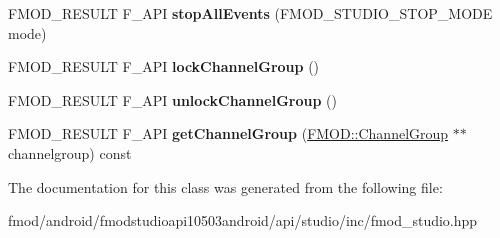 \begin{DoxyCompactItemize}
\item 
\hypertarget{class_f_m_o_d_1_1_studio_1_1_bus_ad59d014793f9eba2a59474b5122981d0}{F\+M\+O\+D\+\_\+\+R\+E\+S\+U\+L\+T F\+\_\+\+A\+P\+I {\bfseries stop\+All\+Events} (F\+M\+O\+D\+\_\+\+S\+T\+U\+D\+I\+O\+\_\+\+S\+T\+O\+P\+\_\+\+M\+O\+D\+E mode)}\label{class_f_m_o_d_1_1_studio_1_1_bus_ad59d014793f9eba2a59474b5122981d0}

\item 
\hypertarget{class_f_m_o_d_1_1_studio_1_1_bus_a11e793b7d91e8e0736f5058706f79fb0}{F\+M\+O\+D\+\_\+\+R\+E\+S\+U\+L\+T F\+\_\+\+A\+P\+I {\bfseries lock\+Channel\+Group} ()}\label{class_f_m_o_d_1_1_studio_1_1_bus_a11e793b7d91e8e0736f5058706f79fb0}

\item 
\hypertarget{class_f_m_o_d_1_1_studio_1_1_bus_a5b5f9cff36e851ea11599bc0a62fb052}{F\+M\+O\+D\+\_\+\+R\+E\+S\+U\+L\+T F\+\_\+\+A\+P\+I {\bfseries unlock\+Channel\+Group} ()}\label{class_f_m_o_d_1_1_studio_1_1_bus_a5b5f9cff36e851ea11599bc0a62fb052}

\item 
\hypertarget{class_f_m_o_d_1_1_studio_1_1_bus_a29e3284914c70c4e41c26b9f537a8463}{F\+M\+O\+D\+\_\+\+R\+E\+S\+U\+L\+T F\+\_\+\+A\+P\+I {\bfseries get\+Channel\+Group} (\hyperlink{class_f_m_o_d_1_1_channel_group}{F\+M\+O\+D\+::\+Channel\+Group} $\ast$$\ast$channelgroup) const }\label{class_f_m_o_d_1_1_studio_1_1_bus_a29e3284914c70c4e41c26b9f537a8463}

\end{DoxyCompactItemize}


The documentation for this class was generated from the following file\+:\begin{DoxyCompactItemize}
\item 
fmod/android/fmodstudioapi10503android/api/studio/inc/fmod\+\_\+studio.\+hpp\end{DoxyCompactItemize}
